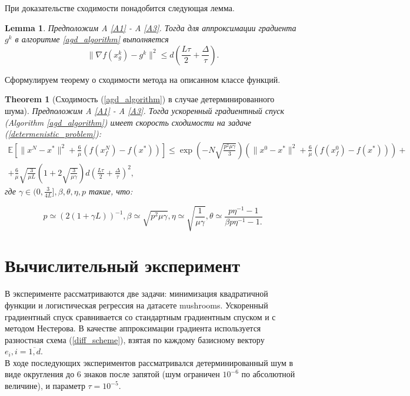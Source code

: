 \documentclass{article}
\newtheorem{theorem}{Theorem}
\newtheorem{lemma}{Lemma}
\begin{document}
При доказательстве сходимости понадобится следующая лемма.
\begin{lemma}
 Предположим A \ref{A1} - A \ref{A3}. Тогда для аппроксимации градиента $g^k$ в алгоритме \ref{agd_algorithm} выполняется
 \begin{equation}
  \|\nabla f(x_g^k) - g^k\|^2 \leqslant d (\frac{L\tau}{2} + \frac{\Delta}{\tau}).
  \label{approximation_estimate}
 \end{equation}

\end{lemma}

Сформулируем теорему о сходимости метода на описанном классе функций.

\begin{theorem}[Сходимость (\ref{agd_algorithm}) в случае детерминированного шума]
  Предположим A \ref{A1} - A \ref{A3}. Тогда ускоренный градиентный спуск (Algorithm \ref{agd_algorithm}) имеет скорость сходимости на задаче (\ref{determenistic_problem}):
  \begin{equation}
   \begin{aligned}
   \mathbb{E}\left[\|x^N - x^*\|^2 + \frac{6}{\mu} (f(x_f^N) - f(x^*))\right] \leqslant \exp\left(- N\sqrt{\frac{p^2\mu\gamma}{3}}\right) \left(\|x^0 - x^*\|^2 + \frac{6}{\mu} (f(x_f^0) - f(x^*))\right) + \\
   + \frac{6}{\mu} \sqrt{\frac{3}{\mu L}} \left(1 + 2\sqrt{\frac{3}{\mu \gamma}}\right) d \left(\frac{L\tau}{2} + \frac{\Delta}{\tau}\right)^2,
   \label{deterministic_convergence}
   \end{aligned}
  \end{equation}
  где $\gamma \in (0, \frac{3}{4L}], \beta, \theta, \eta, p$ такие, что:

  \begin{equation}
   p \simeq (2(1 + \gamma L))^{-1}, \beta \simeq \sqrt{p^2 \mu \gamma}, \eta \simeq \sqrt{\frac{1}{\mu\gamma}}, \theta \simeq \frac{p \eta^{-1} - 1}{\beta p \eta^{-1} - 1.}
  \end{equation}

\end{theorem}


\section{Вычислительный эксперимент}
В эксперименте рассматриваются две задачи: минимизация квадратичной функции и логистическая регрессия на датасете mushrooms. Ускоренный градиентный спуск сравнивается со стандартным градиентным спуском и с методом Нестерова. В качестве аппроксимации градиента используется разностная схема (\ref{diff_scheme}), взятая по каждому базисному вектору $e_i, i = \overline{1, d}$.\\
В ходе последующих экспериментов рассматривался детерминированный шум в виде округления до 6 знаков после запятой (шум ограничен $10^{-6}$ по абсолютной величине), и параметр $\tau = 10^{-5}$.
\end{document}
